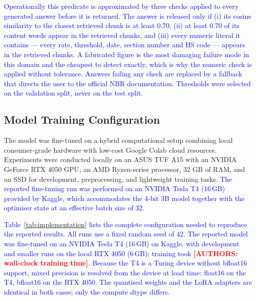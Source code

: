 \documentclass{article}
\newcommand{\revised}[1]{\textcolor{blue}{#1}}
\newcommand{\needsnum}[1]{\textcolor{red}{\textbf{[#1]}}}
\newcommand{\revised}[1]{#1}
\newcommand{\needsnum}[1]{#1}
\begin{document}
\revised{Operationally this predicate is approximated by three checks applied to every
generated answer before it is returned. The answer is released only if (i) its cosine
similarity to the closest retrieved chunk is at least 0.70, (ii) at least 0.70 of its
content words appear in the retrieved chunks, and (iii) every numeric literal it
contains --- every rate, threshold, date, section number and HS code --- appears in the
retrieved chunks. A fabricated figure is the most damaging failure mode in this domain
and the cheapest to detect exactly, which is why the numeric check is applied without
tolerance. Answers failing any check are replaced by a fallback that directs the user to
the official NBR documentation. Thresholds were selected on the validation split, never
on the test split.}

\subsection{Model Training Configuration}
\label{sec:training-config}

The model was fine-tuned on a hybrid computational setup combining local
consumer-grade hardware with low-cost Google Colab cloud resources. Experiments were
conducted locally on an ASUS TUF A15 with an NVIDIA GeForce RTX 4050 GPU, an AMD
Ryzen-series processor, 32 GB of RAM, and an SSD for development, preprocessing, and
lightweight training tasks. \revised{The reported fine-tuning run was performed on an
NVIDIA Tesla T4 (16\,GB) provided by Kaggle, which accommodates the 4-bit 3B model
together with the optimiser state at an effective batch size of 32.}

\revised{Table~\ref{tab:implementation} lists the complete configuration needed to
reproduce the reported results. All runs use a fixed random seed of 42. The reported
model was fine-tuned on an NVIDIA Tesla T4 (16\,GB) on Kaggle, with development and
smaller runs on the local RTX 4050 (6\,GB); training took
\needsnum{AUTHORS: wall-clock training time}. Because the T4 is a
Turing device without bfloat16 support, mixed precision is resolved from the device at
load time: float16 on the T4, bfloat16 on the RTX 4050. The quantised weights and the
LoRA adapters are identical in both cases; only the compute dtype differs.}
\end{document}
